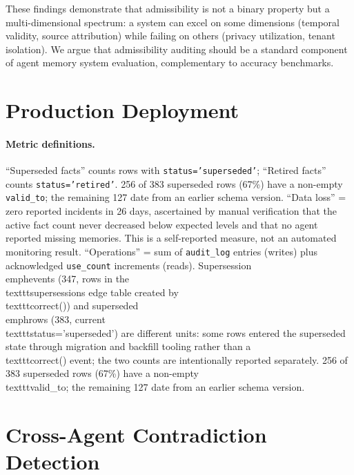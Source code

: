 \documentclass{article}
\begin{document}
These findings demonstrate that admissibility is not a binary property but a multi-dimensional spectrum: a system can excel on some dimensions (temporal validity, source attribution) while failing on others (privacy utilization, tenant isolation). We argue that admissibility auditing should be a standard component of agent memory system evaluation, complementary to accuracy benchmarks.

\section{Production Deployment}
\label{sec:production}



\paragraph{Metric definitions.}
``Superseded facts'' counts rows with \texttt{status='superseded'}; ``Retired facts'' counts \texttt{status='retired'}. 256 of 383 superseded rows (67\%) have a non-empty \texttt{valid\_to}; the remaining 127 date from an earlier schema version. ``Data loss'' = zero reported incidents in 26 days, ascertained by manual verification that the active fact count never decreased below expected levels and that no agent reported missing memories. This is a self-reported measure, not an automated monitoring result. ``Operations'' = sum of \texttt{audit\_log} entries (writes) plus acknowledged \texttt{use\_count} increments (reads).
Supersession \\emph{events} (347, rows in the \\texttt{supersessions} edge table created by \\texttt{correct()}) and superseded \\emph{rows} (383, current \\texttt{status='superseded'}) are different units: some rows entered the superseded state through migration and backfill tooling rather than a \\texttt{correct()} event; the two counts are intentionally reported separately. 256 of 383 superseded rows (67\%) have a non-empty \\texttt{valid\_to}; the remaining 127 date from an earlier schema version.



\section{Cross-Agent Contradiction Detection}
\label{sec:cac}
\end{document}
